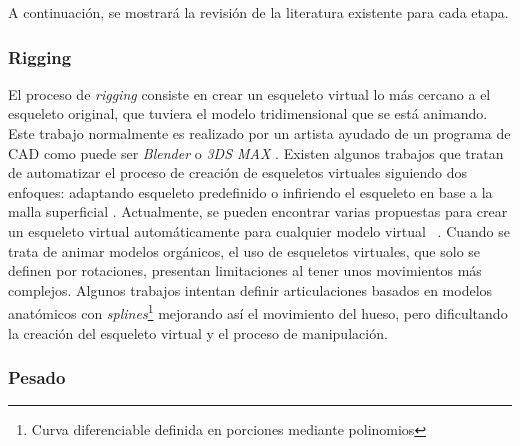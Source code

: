 A continuación, se mostrará la revisión de la literatura existente para cada etapa.
\subsubsection{Rigging}
\label{art:rigging}

El proceso de \emph{rigging} consiste en crear un esqueleto virtual lo más cercano a el esqueleto original, que tuviera el modelo tridimensional que se está animando. Este trabajo normalmente es realizado por un artista ayudado de un programa de \ac{CAD} como puede ser \emph{Blender} \cite{blender} o \emph{3DS MAX} \cite{3ds}. 
Existen algunos trabajos que tratan de automatizar el proceso de creación de esqueletos virtuales siguiendo dos enfoques: adaptando esqueleto predefinido \cite{huang2013robust} o infiriendo el esqueleto en base a la malla superficial \cite{jacobson2014part}.
Actualmente, se pueden encontrar varias propuestas para crear un esqueleto virtual automáticamente para cualquier modelo virtual ~\cite{borosan2012rigmesh,feng2014fast,avril2016animation}.
Cuando se trata de animar modelos orgánicos, el uso de esqueletos virtuales, que solo se definen por rotaciones, presentan limitaciones al tener unos movimientos más complejos. Algunos trabajos intentan definir articulaciones basados en modelos anatómicos \cite{joints} con \emph{splines}\footnote{ Curva diferenciable definida en porciones mediante polinomios} mejorando así el movimiento del hueso, pero dificultando la creación del esqueleto virtual y el proceso de manipulación.



\subsubsection{Pesado}
\label{art:pesado}

